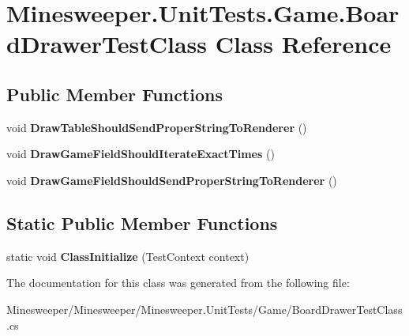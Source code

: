 \hypertarget{class_minesweeper_1_1_unit_tests_1_1_game_1_1_board_drawer_test_class}{\section{Minesweeper.\+Unit\+Tests.\+Game.\+Board\+Drawer\+Test\+Class Class Reference}
\label{class_minesweeper_1_1_unit_tests_1_1_game_1_1_board_drawer_test_class}
}
\subsection*{Public Member Functions}
\begin{DoxyCompactItemize}
\item 
\hypertarget{class_minesweeper_1_1_unit_tests_1_1_game_1_1_board_drawer_test_class_aede9153ca7543a5043ae414a9e54c452}{void {\bfseries Draw\+Table\+Should\+Send\+Proper\+String\+To\+Renderer} ()}\label{class_minesweeper_1_1_unit_tests_1_1_game_1_1_board_drawer_test_class_aede9153ca7543a5043ae414a9e54c452}

\item 
\hypertarget{class_minesweeper_1_1_unit_tests_1_1_game_1_1_board_drawer_test_class_a2c6f520209bf08b4b10f87775f2a5e7d}{void {\bfseries Draw\+Game\+Field\+Should\+Iterate\+Exact\+Times} ()}\label{class_minesweeper_1_1_unit_tests_1_1_game_1_1_board_drawer_test_class_a2c6f520209bf08b4b10f87775f2a5e7d}

\item 
\hypertarget{class_minesweeper_1_1_unit_tests_1_1_game_1_1_board_drawer_test_class_a2ea8b84d12a9226d612bf48b8fbddd93}{void {\bfseries Draw\+Game\+Field\+Should\+Send\+Proper\+String\+To\+Renderer} ()}\label{class_minesweeper_1_1_unit_tests_1_1_game_1_1_board_drawer_test_class_a2ea8b84d12a9226d612bf48b8fbddd93}

\end{DoxyCompactItemize}
\subsection*{Static Public Member Functions}
\begin{DoxyCompactItemize}
\item 
\hypertarget{class_minesweeper_1_1_unit_tests_1_1_game_1_1_board_drawer_test_class_abfcea29963f1db7149c5b12a332d6620}{static void {\bfseries Class\+Initialize} (Test\+Context context)}\label{class_minesweeper_1_1_unit_tests_1_1_game_1_1_board_drawer_test_class_abfcea29963f1db7149c5b12a332d6620}

\end{DoxyCompactItemize}


The documentation for this class was generated from the following file\+:\begin{DoxyCompactItemize}
\item 
Minesweeper/\+Minesweeper/\+Minesweeper.\+Unit\+Tests/\+Game/Board\+Drawer\+Test\+Class.\+cs\end{DoxyCompactItemize}
